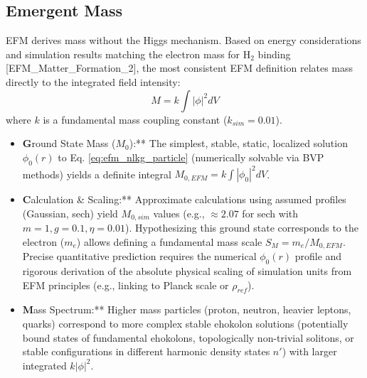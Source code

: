 \documentclass[11pt]{article}
\begin{document}
\subsection{Emergent Mass}
EFM derives mass without the Higgs mechanism. Based on energy considerations and simulation results matching the electron mass for H\(_2\) binding [EFM\_Matter\_Formation\_2], the most consistent EFM definition relates mass directly to the integrated field intensity:
\begin{equation}
M = k \int |\phi|^2 dV
\label{eq:efm_mass}
\end{equation}
where \(k\) is a fundamental mass coupling constant (\(k_{sim}=0.01\)).
\begin{itemize}
    \item \textbf Ground State Mass (\(M_0\)):** The simplest, stable, static, localized solution \(\phi_0(r)\) to Eq. \ref{eq:efm_nlkg_particle} (numerically solvable via BVP methods) yields a definite integral \(M_{0, EFM} = k \int |\phi_0|^2 dV\).
    \item \textbf Calculation \& Scaling:** Approximate calculations using assumed profiles (Gaussian, sech) yield \(M_{0, sim}\) values (e.g., \(\approx 2.07\) for sech with \(m=1, g=0.1, \eta=0.01\)). Hypothesizing this ground state corresponds to the electron (\(m_e\)) allows defining a fundamental mass scale \(S_M = m_e / M_{0, EFM}\). Precise quantitative prediction requires the numerical \(\phi_0(r)\) profile and rigorous derivation of the absolute physical scaling of simulation units from EFM principles (e.g., linking to Planck scale or \(\rho_{ref}\)).
    \item \textbf Mass Spectrum:** Higher mass particles (proton, neutron, heavier leptons, quarks) correspond to more complex stable ehokolon solutions (potentially bound states of fundamental ehokolons, topologically non-trivial solitons, or stable configurations in different harmonic density states \(n'\)) with larger integrated \(k|\phi|^2\).
\end{itemize}
\end{document}
